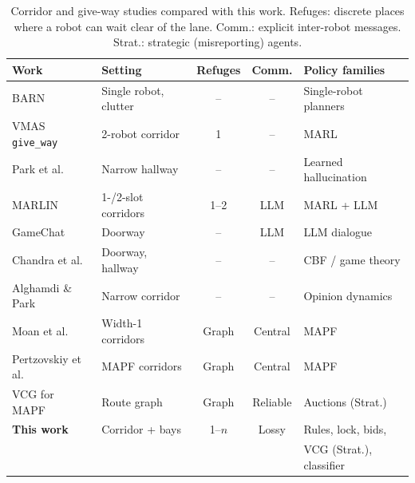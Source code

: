 \begin{table}[!t]
\centering
\caption{Corridor and give-way studies compared with this work. Refuges: discrete places where a robot can wait clear of the lane. Comm.: explicit inter-robot messages. Strat.: strategic (misreporting) agents.}
\label{tab:relwork}
\scriptsize
\setlength{\tabcolsep}{2.5pt}
\begin{tabular}{@{}llccl@{}}
\toprule
Work & Setting & Refuges & Comm. & Policy families \\
\midrule
BARN \cite{xiao2022barn} & Single robot, clutter & -- & -- & Single-robot planners \\
VMAS \texttt{give\_way} \cite{vmasgiveway,bettini2023heterogeneous} & 2-robot corridor & 1 & -- & MARL \\
Park et al. \cite{park2023hallucination} & Narrow hallway & -- & -- & Learned hallucination \\
MARLIN \cite{marlin2024} & 1-/2-slot corridors & 1--2 & LLM & MARL + LLM \\
GameChat \cite{gamechat2025} & Doorway & -- & LLM & LLM dialogue \\
Chandra et al. \cite{chandra2025deadlock,chandra2026social} & Doorway, hallway & -- & -- & CBF / game theory \\
Alghamdi \& Park \cite{alghamdi2025opinion} & Narrow corridor & -- & -- & Opinion dynamics \\
Moan et al. \cite{experience2024narrow} & Width-1 corridors & Graph & Central & MAPF \\
Pertzovskiy et al. \cite{macga2025} & MAPF corridors & Graph & Central & MAPF \\
VCG for MAPF \cite{amir2015mapfauction,friedrich2024scalable,gautier2022negotiated} & Route graph & Graph & Reliable & Auctions (Strat.) \\
\textbf{This work} & Corridor + bays & 1--$n$ & Lossy & Rules, lock, bids, \\
 & & & & VCG (Strat.), classifier \\
\bottomrule
\end{tabular}
\vspace{-0.3cm}
\end{table}
